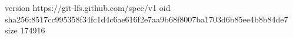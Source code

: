 version https://git-lfs.github.com/spec/v1
oid sha256:8517cc995358f34fc1d4c6ae616f2e7aa9b68f8007ba1703d6b85ee4b8b84de7
size 174916
